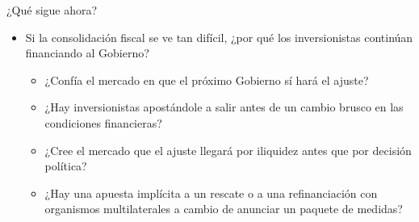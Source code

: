 \begin{frame}{¿Qué sigue ahora?}
\begin{itemize}
    \item Si la consolidación fiscal se ve tan difícil, ¿por qué los inversionistas continúan financiando al Gobierno?
    \begin{itemize}
        \item ¿Confía el mercado en que el próximo Gobierno sí hará el ajuste?
        \item ¿Hay inversionistas apostándole a salir antes de un cambio brusco en las condiciones financieras?
        \item ¿Cree el mercado que el ajuste llegará por iliquidez antes que por decisión política?
        \item ¿Hay una apuesta implícita a un rescate o a una refinanciación con organismos multilaterales a cambio de anunciar un paquete de medidas?
    \end{itemize}
\end{itemize}
\end{frame}
